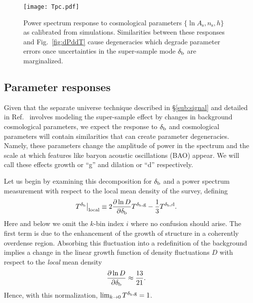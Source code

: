 \documentclass[prd,twocolumn,amsmath,amssymb,floatfix,superscriptaddress]{revtex4-1}
\newcommand{\lnAs}{{\ln\!A_\textrm{s}}}
\newcommand{\ns}{{n_\textrm{s}}}
\newcommand{\br}{{\rm b}}
\begin{document}
{{\begin{figure}[tb]
    \centering
    \texttt{[image: Tpc.pdf]}
    \caption{
        \footnotesize 
        Power spectrum response to cosmological parameters $\{ \lnAs, \ns, h \}$ 
        as calibrated from simulations.    Similarities between these responses and
        Fig.~\ref{fig:dPddT} cause degeneracies which degrade parameter errors once uncertainties
        in the super-sample mode $\delta_\br$ are marginalized.}
    \label{fig:Tp}
\end{figure}






\subsection{Parameter responses}
\label{sub:Ts}

Given that the separate universe technique described in \S \ref{sub:signal} and detailed in Ref.~\cite{Lietal:14} 
involves modeling the super-sample effect by changes in background cosmological parameters, we expect the
response to $\delta_\br$ and cosmological parameters will contain similarities that can create parameter 
degeneracies.  Namely, these parameters change the amplitude of power in the spectrum and the
scale at which  features like baryon acoustic oscillations 
(BAO)
appear.  We will call these
effects growth or ``g''  and  dilation or ``d'' respectively.

Let us begin by examining this decomposition for $\delta_\br$ and a power spectrum measurement with respect to the local mean density of the survey, defining
\begin{equation}
    T^{\delta_\br} \big|_\textrm{local} \equiv 2 \frac{\partial \ln D}{\partial \delta_\br }  T^{\delta_\br,\textrm{g}} - \frac13 T^{\delta_\br,\textrm{d}}.
    \label{eq:Tb}
\end{equation}
Here and below we omit the $k$-bin index 
$i$ where no confusion should arise.
The first term is due to the enhancement of the growth of structure in a coherently
overdense region.   Absorbing this fluctuation into a redefinition of the background implies a change in the linear growth function of
density fluctuations $D$ with respect to the {\it local} mean density 
\cite{Baldauf:2011bh}
\begin{equation}
\frac{\partial \ln D}{\partial \delta_\br } \approx \frac{13}{21}.
\end{equation}
%
{Hence, with this normalization,  $\lim_{k\rightarrow 0}T^{\delta_\br,
\textrm{g}}=1$.}

}}
\end{document}

